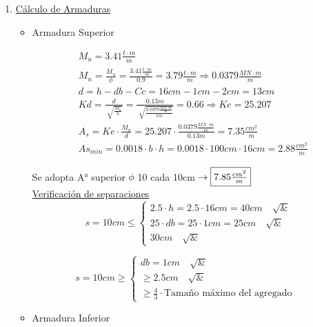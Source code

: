 \begin{enumerate}
\newpage
\item \underline{Cálculo de Armaduras}\\
\begin{itemize}
\item Armadura Superior

\begin{align*}
& M_u = 3.41 \frac{t \cdot m}{m} \\
& M_n = \frac{M_u}{\phi} = \frac{3.41 \frac{t \cdot m}{m}}{0.9} = 3.79 \frac{t \cdot m}{m} \Rightarrow 0.0379 \frac{MN \cdot m}{m} \\
& d = h -db - Cc = 16cm - 1cm - 2cm = 13cm \\
& Kd = \frac{d}{\sqrt[]{\frac{M_n}{b}}} = \frac{0.13m}{\sqrt[]{\frac{0.0379 \frac{MN \cdot m}{m}}{1m}}} = 0.66 \Rightarrow Ke = 25.207 \\
& A_s = Ke \cdot \frac{M_n}{d} = 25.207 \cdot \frac{0.0379 \frac{MN \cdot m}{m}}{0.13m} = 7.35 \frac{cm^2}{m}\\
& As_{min} = 0.0018 \cdot b \cdot h = 0.0018 \cdot 100cm \cdot 16cm = 2.88 \frac{cm^2}{m}
\end{align*}

Se adopta A° superior $\phi$ 10 cada 10cm $\rightarrow \framebox{$7.85 \frac{cm^2}{m}$}$ \\

\underline{Verificación de separaciones}\\

\[ s = 10cm \leq \left\{ \begin{array}{ll}
         2.5 \cdot h = 2.5 \cdot 16cm = 40cm \quad \surd & \\
         25 \cdot db = 25 \cdot 1cm = 25cm \quad \surd &\\
         30cm \quad \surd & \end{array} \right. \] 
         
\[ s =10cm \geq \left\{ \begin{array}{ll}
         db = 1cm \quad \surd & \\
         \geq 2.5cm \quad \surd &\\
         \geq \frac{4}{3} \cdot \text{Tamaño máximo del agregado} & \end{array} \right. \] 

\item Armadura Inferior


\end{itemize}
\end{enumerate}
